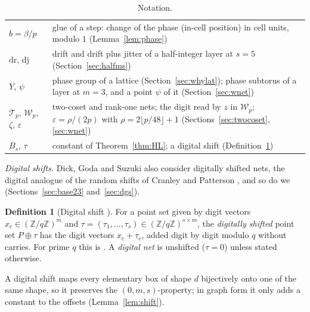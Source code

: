 \documentclass[11pt]{amsart}
\theoremstyle{definition}
\newtheorem{definition}[theorem]{Definition}
\theoremstyle{plain}
\newcommand{\Z}{\mathbb{Z}}
\begin{document}
\begin{table}[tbp]
\begin{tabular}{@{}l>{\raggedright\arraybackslash}p{11.5cm}@{}}
$b=\beta/p$ & glue of a step: change of the phase (in-cell position) in cell units, modulo $1$ (Lemma~\ref{lem:phase})\\
$\mathrm{dr}$, $\mathrm{dj}$ & drift and drift plus jitter of a half-integer layer at $s=5$ (Section~\ref{sec:halfms})\\
$Y$, $\psi$ & phase group of a lattice (Section~\ref{sec:whylat}); phase subtorus of a layer at $m=3$, and a point $\psi$ of it (Section~\ref{sec:wnet})\\
$\mathcal T_p$, $\mathcal W_p$, $\zeta$, $\varepsilon$ & two-coset and rank-one nets; the digit read by $z$ in $\mathcal W_p$; $\varepsilon=\rho/(2p)$ with $\rho=2\lfloor p/48\rfloor+1$ (Sections~\ref{sec:twocoset}, \ref{sec:wnet})\\
$B_s$, $\tau$ & constant of Theorem~\ref{thm:HL}; a digital shift (Definition~\ref{def:dshift})\\
\bottomrule
\end{tabular}
\caption{Notation.}
\label{tab:notation}
\end{table}

\emph{Digital shifts.} Dick, Goda and Suzuki also consider digitally shifted nets, the digital analogue of the random shifts of Cranley and Patterson \cite{CP76}, and so do we (Sections~\ref{sec:base23} and~\ref{sec:dgs}).

\begin{definition}[Digital shift {\cite[Def.~2.2]{DGS2}}]\label{def:dshift}
For a point set given by digit vectors $x_c\in(\Z/q\Z)^m$ and $\tau=(\tau_1,\dots,\tau_s)\in(\Z/q\Z)^{s\times m}$, the \emph{digitally shifted} point set $P\oplus\tau$ has the digit vectors $x_c+\tau_c$, added digit by digit modulo $q$ without carries. For prime $q$ this is \cite[Def.~2.2]{DGS2}. A \emph{digital net} is unshifted ($\tau=0$) unless stated otherwise.
\end{definition}

A digital shift maps every elementary box of shape $d$ bijectively onto one of the same shape, so it preserves the $(0,m,s)$-property; in graph form it only adds a constant to the offsets (Lemma~\ref{lem:shift}).
\end{document}
